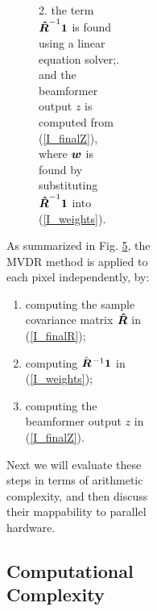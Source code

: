 \begin{figure}[htbp]
\begin{figure}[htbp]
\begin{figure}[tbp]
\begin{figure}[!t]
\begin{figure}[!t]
{2. the term $\boldsymbol{\hat R}^{-1}\boldsymbol{1}$ is found using a linear equation solver;. and the beamformer output $z$ is computed from (\ref{I_finalZ}), where $\boldsymbol{w}$ is found by substituting $\boldsymbol{\hat R}^{-1}\boldsymbol{1}$ into (\ref{I_weights}). } \label{I_mvdr_beamforming}
\end{figure}
As summarized in Fig. \ref{I_mvdr_beamforming}, the MVDR method is applied to each pixel independently, by:
\begin{enumerate}
\item computing the sample covariance matrix $\boldsymbol{\hat R}$ in (\ref{I_finalR});
\item computing $\hat{\boldsymbol{R}}\;\!^{-1}\boldsymbol{1}$ in (\ref{I_weights});
\item computing the beamformer output $z$ in (\ref{I_finalZ}).
\end{enumerate}
Next we will evaluate these steps in terms of arithmetic complexity, and then discuss their mappability to parallel hardware.

\subsection{Computational Complexity}

 


\end{figure}
\end{figure}
\end{figure}
\end{figure}
